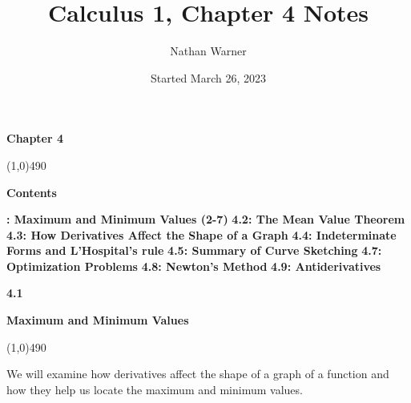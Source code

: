 \documentclass{report}
\title{\Huge{Calculus 1, Chapter 4 Notes}}
\author{\huge{Nathan Warner}}
\date{\huge{Started March 26, 2023}}
\begin{document}
    \maketitle
    \begin{center}
        \begin{Huge}
            \textbf{Chapter 4}
        \end{Huge}
    \end{center}
    \line(1,0){490}
    \bigbreak \noindent \bigbreak \noindent  
    \begin{Huge}
        \noindent \textbf{Contents}
    \end{Huge}
    \bigbreak \noindent
    \begin{Large}
        \bigbreak \noindent 
        \textbf{: Maximum and Minimum Values (2-7)}
        \bigbreak \noindent \bigbreak \noindent 
        \textbf{4.2: The Mean Value Theorem}
        \bigbreak \noindent \bigbreak \noindent 
        \textbf{4.3: How Derivatives Affect the Shape of a Graph}
        \bigbreak \noindent \bigbreak \noindent 
        \textbf{4.4: Indeterminate Forms and L'Hospital's rule}
        \bigbreak \noindent \bigbreak \noindent 
        \textbf{4.5: Summary of Curve Sketching}
        \bigbreak \noindent \bigbreak \noindent 
        \textbf{4.7: Optimization Problems}
        \bigbreak \noindent \bigbreak \noindent 
        \textbf{4.8: Newton's Method}
        \bigbreak \noindent \bigbreak \noindent 
        \textbf{4.9: Antiderivatives}
    \end{Large}
    \pagebreak \bigbreak \noindent

    \begin{Large}
        \begin{mdframed}
            \begin{center}
                \textbf{4.1}
            \end{center}
        \end{mdframed}
    \end{Large}
    \begin{Large}
        \begin{center}
            \textbf{Maximum and Minimum Values}
        \end{center}
    \end{Large}
    \line(1,0){490}
    
    \bigbreak \noindent \bigbreak \noindent \bigbreak \noindent 
    We will examine how derivatives affect the shape of a graph of a function 
    and how they help us locate the maximum and minimum values.
\end{document}
